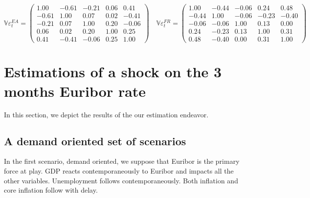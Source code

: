 \documentclass[
  10pt,
]{article}
\begin{document}
\begin{equation}
\mathbb{V}\varepsilon^{EA}_t = 
\begin{pmatrix}
 1.00 & -0.61 & -0.21 & 0.06 & 0.41 \\
-0.61 & 1.00 & 0.07 & 0.02 & -0.41 \\
-0.21 & 0.07 & 1.00 & 0.20 & -0.06 \\
0.06 & 0.02 & 0.20 & 1.00 & 0.25 \\
0.41 & -0.41 & -0.06 & 0.25 & 1.00 
\end{pmatrix}
\quad
\mathbb{V}\varepsilon^{FR}_t = 
\begin{pmatrix}
 1.00 & -0.44 & -0.06 & 0.24 & 0.48 \\
-0.44 & 1.00 & -0.06 & -0.23 & -0.40 \\
-0.06 & -0.06 & 1.00 & 0.13 & 0.00 \\
0.24 & -0.23 & 0.13 & 1.00 & 0.31 \\
0.48 & -0.40 & 0.00 & 0.31 & 1.00 
\end{pmatrix}
\label{eq:variances}
\end{equation}

\hypertarget{sec:est}{%
\section{Estimations of a shock on the 3 months Euribor rate}\label{sec:est}}

In this section, we depict the results of the our estimation endeavor.

\hypertarget{a-demand-oriented-set-of-scenarios}{%
\subsection{A demand oriented set of scenarios}\label{a-demand-oriented-set-of-scenarios}}

In the first scenario, demand oriented, we suppose that Euribor is the primary force at play. GDP reacts contemporaneously to Euribor and impacts all the other variables. Unemployment follows contemporaneously. Both inflation and core inflation follow with delay.
\end{document}
